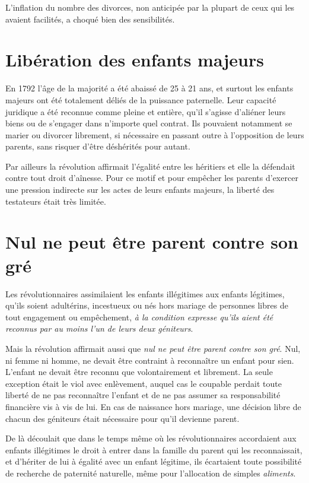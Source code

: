  L'inflation du nombre des divorces, non anticipée par la plupart de ceux qui les avaient facilités, a choqué bien des sensibilités.


\section{Libération des enfants majeurs}

 En 1792 l'âge de la majorité a été abaissé de 25 à 21 ans, et surtout les enfants majeurs ont été totalement déliés de la puissance paternelle. Leur capacité juridique a été reconnue comme pleine et entière, qu'il s'agisse d'aliéner leurs biens ou de s'engager dans n'importe quel contrat. Ils pouvaient notamment se marier ou divorcer librement, si nécessaire en passant outre à l'opposition de leurs parents, sans risquer d'être déshérités pour autant. 

 Par ailleurs la révolution affirmait l'égalité entre les héritiers et elle la défendait contre tout droit d'aînesse. Pour ce motif et pour empêcher les parents d'exercer une pression indirecte sur les actes de leurs enfants majeurs, la liberté des testateurs était très limitée.


\section{Nul ne peut être parent contre son gré}

 Les révolutionnaires assimilaient les enfants illégitimes aux enfants légitimes, qu'ils soient adultérins, incestueux ou nés hors mariage de personnes libres de tout engagement ou empêchement, \emph{à la condition expresse qu'ils aient été reconnus par au moins l'un de leurs deux géniteurs}. 

 Mais la révolution affirmait aussi que \emph{nul ne peut être parent contre son gré}. Nul, ni femme ni homme, ne devait être contraint à reconnaître un enfant pour sien. L'enfant ne devait être reconnu que volontairement et librement. La seule exception était le viol avec enlèvement, auquel cas le coupable perdait toute liberté de ne pas reconnaître l'enfant et de ne pas assumer sa responsabilité financière vis à vis de lui. En cas de naissance hors mariage, une décision libre de chacun des géniteurs était nécessaire pour qu'il devienne parent. 

 De là découlait que dans le temps même où les révolutionnaires accordaient aux enfants illégitimes le droit à entrer dans la famille du parent qui les reconnaissait, et d'hériter de lui à égalité avec un enfant légitime, ils écartaient toute possibilité de recherche de paternité naturelle, même pour l'allocation de simples \emph{aliments}. 

